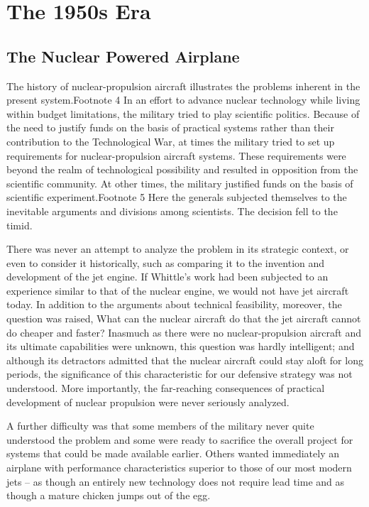 \section{The 1950s Era}
\subsection{The Nuclear Powered Airplane}
The history of nuclear-propulsion aircraft illustrates the problems inherent in the present system.Footnote 4 In an effort to advance nuclear technology while living within budget limitations, the military tried to play scientific politics. Because of the need to justify funds on the basis of practical systems rather than their contribution to the Technological War, at times the military tried to set up requirements for nuclear-propulsion aircraft systems. These requirements were beyond the realm of technological possibility and resulted in opposition from the scientific community. At other times, the military justified funds on the basis of scientific experiment.Footnote 5 Here the generals subjected themselves to the inevitable arguments and divisions among scientists. The decision fell to the timid.

There was never an attempt to analyze the problem in its strategic context, or even to consider it historically, such as comparing it to the invention and development of the jet engine. If Whittle's work had been subjected to an experience similar to that of the nuclear engine, we would not have jet aircraft today. In addition to the arguments about technical feasibility, moreover, the question was raised, What can the nuclear aircraft do that the jet aircraft cannot do cheaper and faster? Inasmuch as there were no nuclear-propulsion aircraft and its ultimate capabilities were unknown, this question was hardly intelligent; and although its detractors admitted that the nuclear aircraft could stay aloft for long periods, the significance of this characteristic for our defensive strategy was not understood. More importantly, the far-reaching consequences of practical development of nuclear propulsion were never seriously analyzed.

A further difficulty was that some members of the military never quite understood the problem and some were ready to sacrifice the overall project for systems that could be made available earlier. Others wanted immediately an airplane with performance characteristics superior to those of our most modern jets -- as though an entirely new technology does not require lead time and as though a mature chicken jumps out of the egg.


